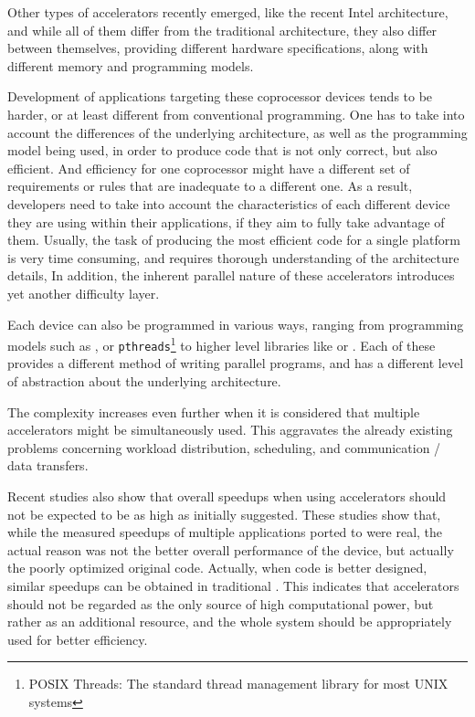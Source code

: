 \documentclass[main.tex]{subfiles}
\begin{document}
Other types of accelerators recently emerged, like the recent Intel \mic architecture, and while all of them differ from the traditional \cpu architecture, they also differ between themselves, providing different hardware specifications, along with different memory and programming models.

Development of applications targeting these coprocessor devices tends to be harder, or at least different from conventional programming. One has to take into account the differences of the underlying architecture, as well as the programming model being used, in order to produce code that is not only correct, but also efficient. And efficiency for one coprocessor might have a different set of requirements or rules that are inadequate to a different one. As a result, developers need to take into account the characteristics of each different device they are using within their applications, if they aim to fully take advantage of them. Usually, the task of producing the most efficient code for a single platform is very time consuming, and requires thorough understanding of the architecture details, In addition, the inherent parallel nature of these accelerators introduces yet another difficulty layer.

Each device can also be programmed in various ways, ranging from programming models such as \cuda, \opencl or \texttt{pthreads}\footnote{POSIX Threads: The standard thread management library for most UNIX systems} to higher level libraries like \openmp or \openacc. Each of these provides a different method of writing parallel programs, and has a different level of abstraction about the underlying architecture.

The complexity increases even further when it is considered that multiple accelerators might be simultaneously used. This aggravates the already existing problems concerning workload distribution, scheduling, and communication / data transfers.

Recent studies \cite{lee2010debunking,bordawekar2010believe} also show that overall speedups when using accelerators should not be expected to be as high as initially suggested. These studies show that, while the measured speedups of multiple applications ported to \gpus were real, the actual reason was not the better overall performance of the device, but actually the poorly optimized original \cpu code. Actually, when code is better designed, similar speedups can be obtained in traditional \cpus. This indicates that accelerators should not be regarded as the only source of high computational power, but rather as an additional resource, and the whole system should be appropriately used for better efficiency.
\end{document}
